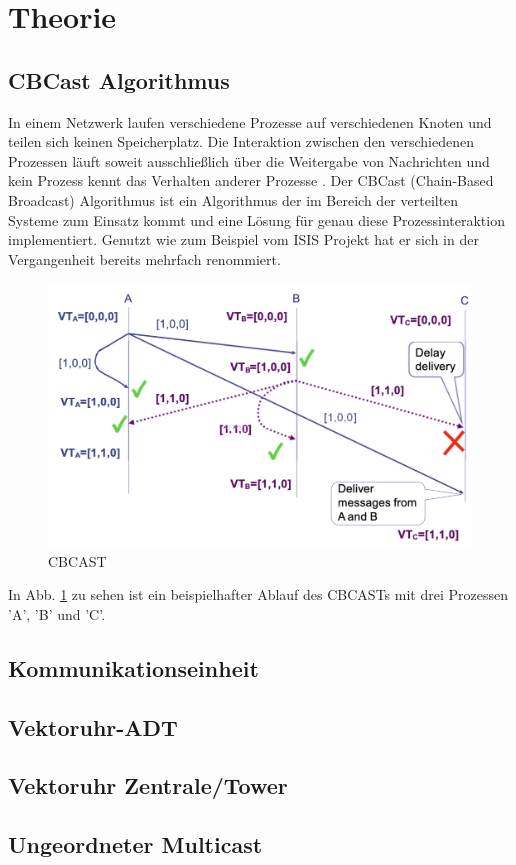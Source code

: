\section{Theorie}

\subsection{CBCast Algorithmus}

In einem Netzwerk laufen verschiedene Prozesse auf verschiedenen Knoten und teilen sich keinen Speicherplatz. Die Interaktion zwischen den verschiedenen Prozessen läuft soweit ausschließlich über die Weitergabe von Nachrichten und kein Prozess kennt das Verhalten anderer Prozesse \cite{CBCAST_1}. Der CBCast (Chain-Based Broadcast) Algorithmus ist ein Algorithmus der im Bereich der verteilten Systeme zum Einsatz kommt und eine Lösung für genau diese Prozessinteraktion implementiert. Genutzt wie zum Beispiel vom ISIS Projekt \cite{isis_project} hat er sich in der Vergangenheit bereits mehrfach renommiert. 

\begin{figure}[htbp]
\begin{center}
\includegraphics[scale=0.4]{Latex/Bilder/cbcast_2.png}
\caption{\label{fig:cbcastFunction} CBCAST \cite{Aufgabenstellung}} 
\end{center}
\end{figure}

In Abb. \ref{fig:cbcastFunction} zu sehen ist ein beispielhafter Ablauf des CBCASTs mit drei Prozessen 'A', 'B' und 'C'. 

\subsection{Kommunikationseinheit}

\subsection{Vektoruhr-ADT}

\subsection{Vektoruhr Zentrale/Tower}

\subsection{Ungeordneter Multicast}

